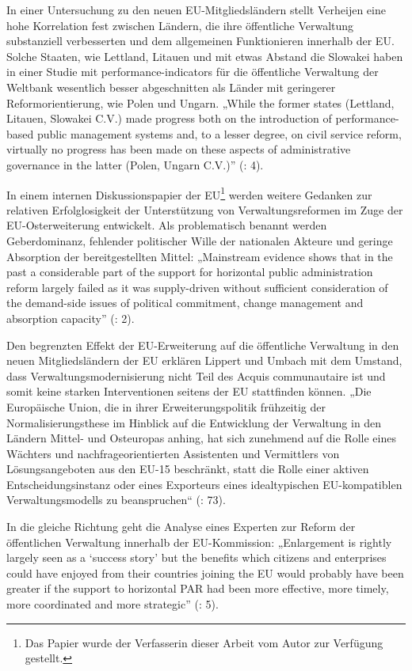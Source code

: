 In einer Untersuchung zu den neuen EU-Mitgliedsländern stellt Verheijen eine hohe Korrelation fest zwischen Ländern, die ihre öffentliche Verwaltung substanziell verbesserten und dem allgemeinen Funktionieren innerhalb der EU. Solche Staaten, wie Lettland, Litauen und mit etwas Abstand die Slowakei haben in einer Studie mit performance-indicators für die öffentliche Verwaltung der Weltbank wesentlich besser abgeschnitten als Länder mit geringerer Reformorientierung, wie Polen und Ungarn. „While the former states (Lettland, Litauen, Slowakei C.V.) made progress both on the introduction of performance-based public management systems and, to a lesser degree, on civil service reform, virtually no progress has been made on these aspects of administrative governance in the latter (Polen, Ungarn C.V.)” (\cite{verheijen09}: 4).\par
In einem internen Diskussionspapier der EU\footnote{Das Papier wurde der Verfasserin dieser Arbeit vom Autor zur Verfügung gestellt.} werden weitere Gedanken zur relativen Erfolglosigkeit der Unterstützung von Verwaltungsreformen im Zuge der EU-Osterweiterung entwickelt. Als problematisch benannt werden Geberdominanz, fehlender politischer Wille der nationalen Akteure und geringe Absorption der bereitgestellten Mittel: „Mainstream evidence shows that in the past a considerable part of the support for horizontal public administration reform largely failed as it was supply-driven without sufficient consideration of the demand-side issues of political commitment, change management and absorption capacity” (\cite{apelb07}: 2). \par
Den begrenzten Effekt der EU-Erweiterung auf die öffentliche Verwaltung in den neuen Mitgliedsländern der EU erklären Lippert und Umbach mit dem Umstand, dass Verwaltungsmodernisierung nicht Teil des Acquis communautaire ist und somit keine starken Interventionen seitens der EU stattfinden können. „Die Europäische Union, die in ihrer Erweiterungspolitik frühzeitig der Normalisierungsthese im Hinblick auf die Entwicklung der Verwaltung in den Ländern Mittel- und Osteuropas anhing, hat sich zunehmend auf die Rolle eines Wächters und nachfrageorientierten Assistenten und Vermittlers von Lösungsangeboten aus den EU-15 beschränkt, statt die Rolle einer aktiven Entscheidungsinstanz oder eines Exporteurs eines idealtypischen EU-kompatiblen Verwaltungsmodells zu beanspruchen“ (\cite{lipumb04}: 73).
\par
In die gleiche Richtung geht die Analyse eines Experten zur Reform der öffentlichen Verwaltung innerhalb der EU-Kommission: „Enlargement is rightly largely seen as a ‘success story’ but the benefits which citizens and enterprises could have enjoyed from their countries joining the EU would probably have been greater if the support to horizontal PAR had been more effective, more timely, more coordinated and more strategic” (\cite{apelb09}: 5).\par
